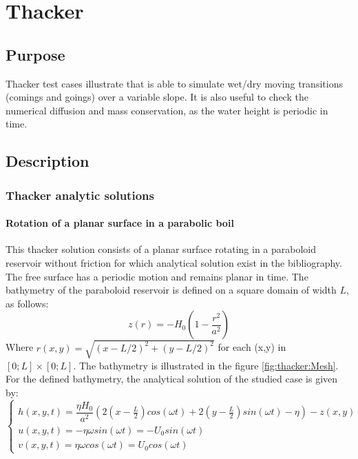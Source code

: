 \chapter{Thacker}
%
\section{Purpose}
Thacker test cases illustrate that  is able to simulate wet/dry moving transitions
(comings and goings) over a variable slope. 
It is also useful to check the numerical diffusion and mass conservation, as the water height is periodic in time.

\section{Description}

\subsection{Thacker analytic solutions}

\subsubsection{Rotation of a planar surface in a parabolic boil}

This thacker solution consists of a planar surface rotating in a paraboloid reservoir without friction for which analytical solution exist in the bibliography.
The free surface has a periodic motion and remains planar in time.
The bathymetry of the paraboloid reservoir is defined on a square domain of width $L$, as follows:
\begin{equation}
  z(r) = -H_0\left(1-\dfrac{r^2}{a^2}\right)
\end{equation}
Where $r(x,y) = \sqrt{(x-L/2)^2 + (y-L/2)^2}$ for each (x,y) in $[0;L] \times [0;L]$.
The bathymetry is illustrated in the figure \ref{fig:thacker:Mesh}.
For the defined bathymetry, the analytical solution of the studied case is given by:
\begin{equation}
  \left\{
    \begin{array}{ll}
        h(x,y,t) = \dfrac{\eta H_0}{a^2} \left(2 \left( x - \frac{L}{2} \right) cos(\omega t) + 2 \left( y - \frac{L}{2} \right) sin(\omega t) - \eta \right) - z(x,y) \\
        u(x,y,t) = - \eta \omega sin(\omega t) = -U_0 sin(\omega t)\\
        v(x,y,t) =  \eta \omega cos(\omega t) = U_0 cos(\omega t)
    \end{array}
    \right.
    \label{eq:thacker:analytical}
\end{equation}

